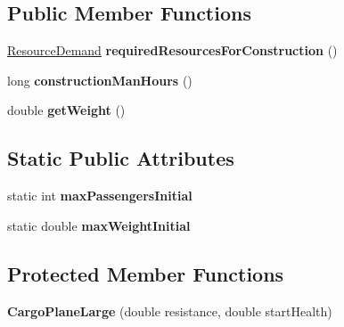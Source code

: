 \subsection*{Public Member Functions}
\begin{DoxyCompactItemize}
\item 
\hyperlink{classuniverse_1_1_resource_demand}{Resource\+Demand} {\bfseries required\+Resources\+For\+Construction} ()\hypertarget{classtools_1_1vehicles_1_1air_1_1_cargo_plane_large_a3940400f9a435668f96719f21de38328}{}\label{classtools_1_1vehicles_1_1air_1_1_cargo_plane_large_a3940400f9a435668f96719f21de38328}

\item 
long {\bfseries construction\+Man\+Hours} ()\hypertarget{classtools_1_1vehicles_1_1air_1_1_cargo_plane_large_ad7f1fb8c372293b356af4acbb69cf29e}{}\label{classtools_1_1vehicles_1_1air_1_1_cargo_plane_large_ad7f1fb8c372293b356af4acbb69cf29e}

\item 
double {\bfseries get\+Weight} ()\hypertarget{classtools_1_1vehicles_1_1air_1_1_cargo_plane_large_a2d2c759d88b3dd3178f6a272224a4fa0}{}\label{classtools_1_1vehicles_1_1air_1_1_cargo_plane_large_a2d2c759d88b3dd3178f6a272224a4fa0}

\end{DoxyCompactItemize}
\subsection*{Static Public Attributes}
\begin{DoxyCompactItemize}
\item 
static int {\bfseries max\+Passengers\+Initial}\hypertarget{classtools_1_1vehicles_1_1air_1_1_cargo_plane_large_a616889824bfec87e01b66f6ffe2ecb17}{}\label{classtools_1_1vehicles_1_1air_1_1_cargo_plane_large_a616889824bfec87e01b66f6ffe2ecb17}

\item 
static double {\bfseries max\+Weight\+Initial}\hypertarget{classtools_1_1vehicles_1_1air_1_1_cargo_plane_large_a73cce3070d692647a1c3727ecc344623}{}\label{classtools_1_1vehicles_1_1air_1_1_cargo_plane_large_a73cce3070d692647a1c3727ecc344623}

\end{DoxyCompactItemize}
\subsection*{Protected Member Functions}
\begin{DoxyCompactItemize}
\item 
{\bfseries Cargo\+Plane\+Large} (double resistance, double start\+Health)\hypertarget{classtools_1_1vehicles_1_1air_1_1_cargo_plane_large_a011263c288e683206ae4302f93f2351a}{}\label{classtools_1_1vehicles_1_1air_1_1_cargo_plane_large_a011263c288e683206ae4302f93f2351a}

\end{DoxyCompactItemize}
